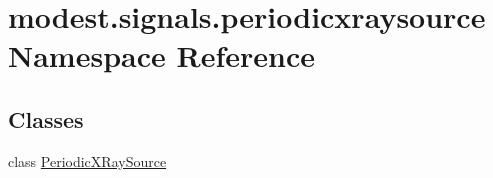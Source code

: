 \hypertarget{namespacemodest_1_1signals_1_1periodicxraysource}{}\section{modest.\+signals.\+periodicxraysource Namespace Reference}
\label{namespacemodest_1_1signals_1_1periodicxraysource}
\subsection*{Classes}
\begin{DoxyCompactItemize}
\item 
class \hyperlink{classmodest_1_1signals_1_1periodicxraysource_1_1PeriodicXRaySource}{Periodic\+X\+Ray\+Source}
\end{DoxyCompactItemize}
